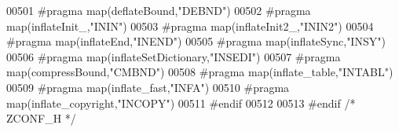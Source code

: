 \begin{DoxyCode}
00501 \textcolor{preprocessor}{  #pragma map(deflateBound,"DEBND")}
00502 \textcolor{preprocessor}{  #pragma map(inflateInit\_,"ININ")}
00503 \textcolor{preprocessor}{  #pragma map(inflateInit2\_,"ININ2")}
00504 \textcolor{preprocessor}{  #pragma map(inflateEnd,"INEND")}
00505 \textcolor{preprocessor}{  #pragma map(inflateSync,"INSY")}
00506 \textcolor{preprocessor}{  #pragma map(inflateSetDictionary,"INSEDI")}
00507 \textcolor{preprocessor}{  #pragma map(compressBound,"CMBND")}
00508 \textcolor{preprocessor}{  #pragma map(inflate\_table,"INTABL")}
00509 \textcolor{preprocessor}{  #pragma map(inflate\_fast,"INFA")}
00510 \textcolor{preprocessor}{  #pragma map(inflate\_copyright,"INCOPY")}
00511 \textcolor{preprocessor}{#endif}
00512 
00513 \textcolor{preprocessor}{#endif }\textcolor{comment}{/* ZCONF\_H */}\textcolor{preprocessor}{}
\end{DoxyCode}
